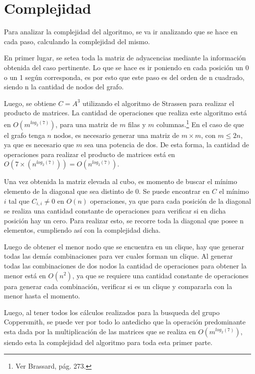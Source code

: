 \documentclass[a4paper, 12pt]{article}
\begin{document}
\section*{Complejidad}

Para analizar la complejidad del algoritmo, se va ir analizando que se hace en cada paso, calculando la complejidad del mismo.

En primer lugar, se setea toda la matriz de adyacencias mediante la informaci\'on obtenida del caso pertinente. Lo que se hace es ir poniendo en cada posici\'on un 0 o un 1 seg\'un corresponda, es por esto que este paso es del orden de n cuadrado, siendo n la cantidad de nodos del grafo.

Luego, se obtiene $C = A^3$ utilizando el algoritmo de Strassen para realizar el producto de matrices. La cantidad de operaciones que realiza este algoritmo est\'a en $O\left(m^{log_2\left(7\right)}\right)$, para una matriz de $m$ filas y $m$ columnas.\footnote{Ver Brassard, p\'ag. 273.} En el caso de que el grafo tenga $n$ nodos, es necesario generar una matriz de $m \times m$, con $m \leq 2n$, ya que es necesario que $m$ sea una potencia de dos. De esta forma, la cantidad de operaciones para realizar el producto de matrices est\'a en $O\left(7 \times \left(n ^{log_2 \left( 7\right)} \right) \right) = O\left(n^{log_2\left(7\right)}\right)$.



Una vez obtenida la matriz elevada al cubo, es momento de buscar el m\'inimo elemento de la diagonal que sea distinto de 0. Se puede encontrar en $C$ el m\'inimo $i$ tal que $C_{i,i} \neq 0$ en $O\left(n\right)$ operaciones, ya que para cada posici\'on de la diagonal se realiza una cantidad constante de operaciones para verificar si en dicha posici\'on hay un cero. Para realizar esto, se recorre toda la diagonal que posee n elementos, cumpliendo as\'i con la complejidad dicha.

Luego de obtener el menor nodo que se encuentra en un clique, hay que generar todas las dem\'as combinaciones para ver cuales forman un clique. 
Al generar todas las combinaciones de dos nodos la cantidad de operaciones para obtener la menor est\'a en $O\left(n^2\right)$, ya que se requiere una cantidad constante de operaciones para generar cada combinaci\'on, verificar si es un clique y compararla con la menor hasta el momento.

Luego, al tener todos los c\'alculos realizados para la busqueda del grupo Coppersmith, se puede ver por todo lo antedicho que la operaci\'on predominante esta dada por la multiplicaci\'on de las matrices que se realiza en $O\left(m^{log_2\left(7\right)}\right)$, siendo esta la complejidad del algoritmo para toda esta primer parte.
\end{document}
